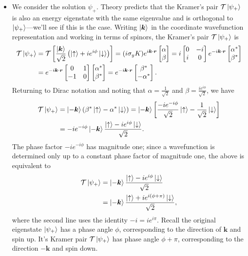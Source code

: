 \documentclass[11pt, a4paper]{article}
\renewcommand{\vec}[1]{\bm{#1}} %
\newcommand{\ua}{\uparrow}  %
\newcommand{\da}{\downarrow}  %
\renewcommand{\k}{\vec{k}}  %
\newcommand{\T}{\mathcal{T}}  %
\begin{document}
\begin{itemize}
	\item We consider the solution $ \psi_{+} $. Theory predicts that the Kramer's pair $ \T \ket{\psi_{+}} $ is also an energy eigenstate with the same eigenvalue and is orthogonal to $ \ket{\psi_{+}} $---we'll see if this is the case. Writing $ \ket{\k} $ in the coordinate wavefunction representation and working in terms of spinors, the Kramer's pair $ \T \ket{\psi_{+}} $ is
	\begin{align*}
		\T \ket{\psi_{+}} & = \T \left[\frac{\ket{\k}}{\sqrt{2}}\left(\ket{\ua} + ie^{i\phi}\ket{\da}\right) \right]= (i \sigma_{y}K)e^{i\k\cdot \vec{r}} 
		\begin{bmatrix}
			\alpha\\
			\beta
		\end{bmatrix}
		= 
		i 
		\begin{bmatrix}
			0 & -i\\
			i & 0
		\end{bmatrix}
		e^{-i\k\cdot \vec{r}} 
		\begin{bmatrix}
			\alpha^{*}\\
			\beta^{*}
		\end{bmatrix}
		\\
		&= 
		e^{-i\k\cdot \vec{r}} 
		\begin{bmatrix}
			0 & 1\\
			-1 & 0
		\end{bmatrix}
		\begin{bmatrix}
			\alpha^{*}\\
			\beta^{*}
		\end{bmatrix}
		 = e^{-i\k\cdot \vec{r}} 
		\begin{bmatrix}
			\beta^{*}\\
			-\alpha^{*}
		\end{bmatrix}.
	\end{align*}
	Returning to Dirac notation and noting that $ \alpha = \frac{1}{\sqrt{2}} $ and $ \beta = \frac{ie^{i\phi}}{\sqrt{2}} $, we have
	\begin{align*}
		\T \ket{\psi_{+}} &= \ket{-\k}  \left(\beta^{*} \ket{\ua} - \alpha^{*}\ket{\da}\right) = \ket{-\k} \left[\frac{-ie^{-i\phi}}{\sqrt{2}}\ket{\ua} - \frac{1}{\sqrt{2}}\ket{\da}\right] \\
		&= -ie^{-i\phi}\ket{-\k} \frac{\ket{\ua} - i e^{i\phi}\ket{\da}}{\sqrt{2}}.
	\end{align*}
	The phase factor $ -ie^{-i\phi} $ has magnitude one; since a wavefunction is determined only up to a constant phase factor of magnitude one, the above is equivalent to
	\begin{align*}
		\T \ket{\psi_{+}} &= \ket{-\k} \frac{\ket{\ua} - i e^{i\phi}\ket{\da}}{\sqrt{2}}\\
		&=\ket{-\k} \frac{\ket{\ua} + i e^{i(\phi + \pi)}\ket{\da}}{\sqrt{2}},
	\end{align*}
	where the second line uses the identity $ -i = ie^{i\pi} $. Recall the original eigenstate $ \ket{\psi_{+}} $ has a phase angle $ \phi $, corresponding to the direction of $ \k $ and spin up. It's Kramer pair $ \T\ket{\psi_{+}} $ has phase angle $ \phi + \pi $, corresponding to the direction $ -\k $ and spin down. 
\end{itemize}
	
\end{document}
